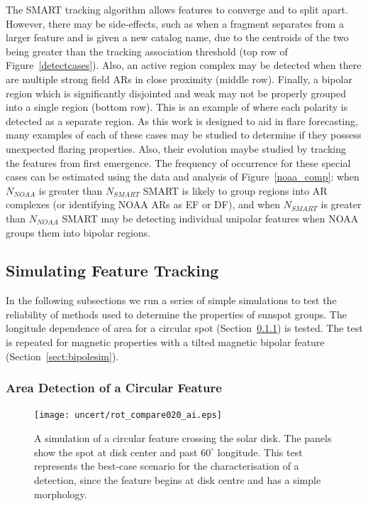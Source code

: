 The \gls{SMART} tracking algorithm allows features to converge and to split apart. However, there may be side-effects, such as when a fragment separates from a larger feature and is given a new catalog name, due to the centroids of the two being greater than the tracking association threshold (top row of Figure~\ref{detectcases}). Also, an active region complex  may be detected when there are multiple strong field \glspl{AR} in close proximity (middle row). Finally, a bipolar region which is significantly disjointed and weak may not be properly grouped into a single region (bottom row). This is an example of where each polarity is detected as a separate region. As this work is designed to aid in flare forecasting, many examples of each of these cases may be studied to determine if they possess unexpected flaring properties. Also, their evolution maybe studied by tracking the features from first emergence. The frequency of occurrence for these special cases can be estimated using the data and analysis of Figure~\ref{noaa_comp}: when $N_{NOAA}$ is greater than $N_{SMART}$ \gls{SMART} is likely to group regions into \gls{AR} complexes (or identifying \gls{NOAA} \glspl{AR} as EF or DF), and when $N_{SMART}$ is greater than $N_{NOAA}$ \gls{SMART} may be detecting individual unipolar features when \gls{NOAA} groups them into bipolar regions.


\subsection{Simulating Feature Tracking}\label{sect:simuncert}

In the following subsections we run a series of simple simulations to test the reliability of methods used to determine the properties of sunspot groups. The longitude dependence of area for a circular spot (Section~\ref{sect:spotsim}) is tested. The test is repeated for magnetic properties with a tilted magnetic bipolar feature (Section~\ref{sect:bipolesim}).


\subsubsection{Area Detection of a Circular Feature}\label{sect:spotsim}

\begin{figure}[!t]
\centerline{\texttt{[image: uncert/rot\_compare020\_ai.eps]}}
\caption[A simulation of a feature crossing the Sun.]{A simulation of a circular feature crossing the solar disk. The panels show the spot at disk center and past $60^{\circ}$ longitude. This test represents the best-case scenario for the characterisation of a detection, since the feature begins at disk centre and has a simple morphology.}\label{fig:spotsim}
\end{figure}

